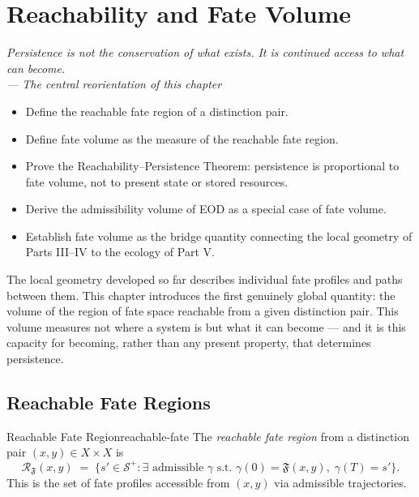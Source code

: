 \documentclass[12pt,twoside,openright]{book}
\newcommand{\distPairs}{X\times X}
\newcommand{\fateMap}{\mathfrak{F}}
\newcommand{\fateSpace}{\mathcal{S}}
\newenvironment{epigraph}[2]{%
  \vspace{1em}\begin{flushright}
  \begin{minipage}{0.72\textwidth}
  \itshape\small #1\\[0.4em]
  \upshape\footnotesize\sffamily\color{DistGray}--- #2
  \end{minipage}\end{flushright}\vspace{1.5em}}{}
\newenvironment{objectives}{%
  \begin{tcolorbox}[colback=DistBlue!5,colframe=DistBlue,
    title={\faCheckCircle\enspace Chapter Objectives},
    fonttitle=\sffamily\bfseries\color{white},
    attach boxed title to top left={yshift=-2mm,xshift=4mm},
    boxed title style={colback=DistBlue},breakable]
  \begin{itemize}[leftmargin=*,nosep]}{%
  \end{itemize}\end{tcolorbox}\vspace{1em}}
\providecommand{\fatePos}{\fateSpace^{+}}
\providecommand{\fateTraj}{\gamma}
\providecommand{\fateReach}[1]{\mathcal{R}_{\fateMap}(#1)}
\begin{document}

\chapter{Reachability and Fate Volume}
\label{ch:fate-volume}

\begin{epigraph}{Persistence is not the conservation of what
  exists. It is continued access to what can become.}%
  {The central reorientation of this chapter}
\end{epigraph}

\begin{objectives}
\item Define the reachable fate region of a distinction pair.
\item Define fate volume as the measure of the reachable fate
  region.
\item Prove the Reachability--Persistence Theorem: persistence
  is proportional to fate volume, not to present state or
  stored resources.
\item Derive the admissibility volume of EOD as a special case
  of fate volume.
\item Establish fate volume as the bridge quantity connecting
  the local geometry of Parts III--IV to the ecology of Part V.
\end{objectives}

The local geometry developed so far describes individual fate
profiles and paths between them. This chapter introduces the
first genuinely global quantity: the volume of the region of
fate space reachable from a given distinction pair. This volume
measures not where a system is but what it can become --- and
it is this capacity for becoming, rather than any present
property, that determines persistence.

\section{Reachable Fate Regions}

\begin{definition}{Reachable Fate Region}{reachable-fate}
The \emph{reachable fate region} from a distinction pair
$(x,y)\in\distPairs$ is
\[
  \fateReach{x,y}
  \;=\;
  \bigl\{
    s'\in\fatePos :
    \exists\text{ admissible }\fateTraj\text{ s.t. }
    \fateTraj(0)=\fateMap(x,y),\;
    \fateTraj(T)=s'
  \bigr\}.
\]
This is the set of fate profiles accessible from $(x,y)$ via
admissible trajectories.
\end{definition}
\end{document}
